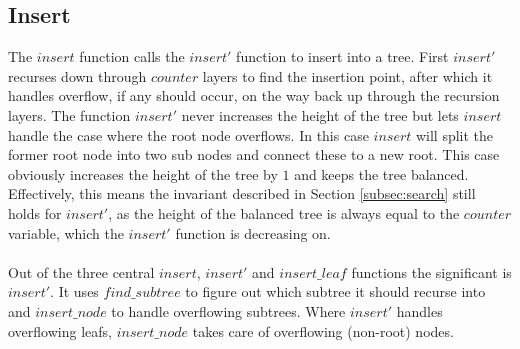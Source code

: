 \subsection{Insert}
The $insert$ function calls the $insert'$ function to insert into a tree. First $insert'$ recurses down through $counter$ layers to find the insertion point, after which it handles overflow, if any should occur, on the way back up through the recursion layers. The function $insert'$ never increases the height of the tree but lets $insert$ handle the case where the root node overflows. In this case $insert$ will split the former root node into two sub nodes and connect these to a new root. This case obviously increases the height of the tree by $1$ and keeps the tree balanced. Effectively, this means the invariant described in Section \ref{subsec:search} still holds for $insert'$, as the height of the balanced tree is always equal to the $counter$ variable, which the $insert'$ function is decreasing on.
\paragraph{}
Out of the three central $insert$, $insert'$ and $insert\_leaf$ functions the significant is $insert'$. It uses $find\_subtree$ to figure out which subtree it should recurse into and $insert\_node$ to handle overflowing subtrees. Where $insert'$ handles overflowing leafs, $insert\_node$ takes care of overflowing (non-root) nodes.


\paragraph{}
